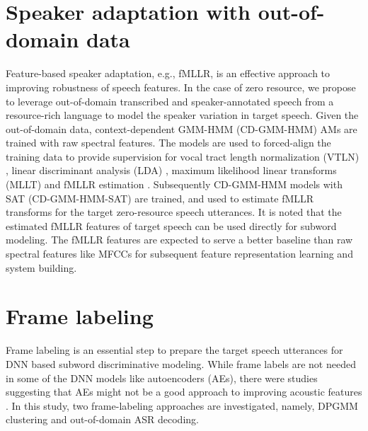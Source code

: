 \documentclass[a4paper]{article}
\begin{document}

\section{Speaker adaptation with out-of-domain data}
\label{sec:SAT}

Feature-based speaker adaptation, e.g., fMLLR, is an effective approach to improving robustness of speech features. In the case of zero resource, we propose to leverage out-of-domain transcribed and speaker-annotated speech from a resource-rich language to model the speaker variation in target speech. Given the out-of-domain data, context-dependent GMM-HMM (CD-GMM-HMM) AMs are trained with raw spectral features. The models are used to forced-align the training data to provide supervision for vocal tract length normalization (VTLN) \cite{kim2004using}, linear discriminant analysis (LDA) \cite{haeb1992linear}, maximum likelihood linear transforms (MLLT) \cite{gales1999semi} and fMLLR estimation \cite{povey2012basis}. Subsequently CD-GMM-HMM models with SAT (CD-GMM-HMM-SAT) are trained, and used to estimate fMLLR transforms for the target zero-resource speech utterances. It is noted that the estimated fMLLR features of target speech can be used directly for subword modeling.
The fMLLR features are expected to serve a better baseline than raw spectral features like MFCCs for subsequent feature representation learning and system building. 

\section{Frame labeling}
\label{sec:frame_labeling}
Frame labeling is an essential step to prepare the target speech utterances for DNN based subword discriminative modeling. While frame labels are not needed in some of the DNN models like autoencoders (AEs), there were studies suggesting that AEs might not be a good approach to improving acoustic features \cite{renshaw2015comparison}. In this study,  two frame-labeling approaches are investigated, namely, DPGMM clustering and out-of-domain ASR decoding. 
\end{document}
